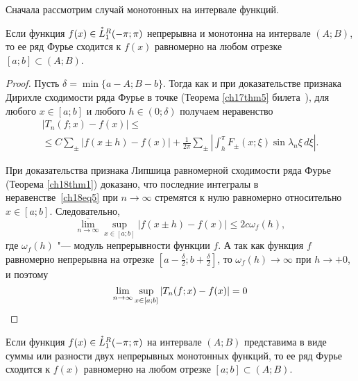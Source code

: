 Сначала рассмотрим случай монотонных на интервале функций.

\begin{thm} \label{ch18thm3}
Если функция $f(x) \in \accentset{*}{L}^{R}_1(-\pi;\pi)$ непрерывна и монотонна на интервале $(A;B)$, то ее ряд Фурье сходится к $f(x)$ равномерно на любом отрезке $[a;b] \subset (A;B)$.
\end{thm}
\begin{proof}
Пусть $\delta = \min \{a - A; B - b\}$. Тогда как и при доказательстве признака Дирихле сходимости ряда Фурье в точке (Теорема \ref{ch17thm5} билета~), для любого $x \in [a;b]$ и любого $h \in (0;\delta)$ получаем неравенство
\begin{multline} \label{ch18eq5}
|T_n(f; x) - f(x)| \le\\
\le C\sum_{\pm}|f(x \pm h) - f(x)| + \frac{1}{2\pi} \sum_{\pm} \left|\int_{h}^{\pi} F_{\pm}(x; \xi) \sin{\lambda_n \xi} \,d\xi \right|.
\end{multline}

При доказательства признака Липшица равномерной сходимости ряда Фурье (Теорема \ref{ch18thm1}) доказано, что последние интегралы в неравенстве~\eqref{ch18eq5} при $n \to \infty$ стремятся к нулю равномерно относительно $x \in [a;b]$. Следовательно,
$$
\overline{\lim\limits_{n \to \infty}} \sup\limits_{x \in [a;b]} |f(x \pm h) - f(x)| \le 2c\omega_{f}(h),
$$
где $\omega_{f}(h)$ "--- модуль непрерывности функции $f$. А так как функция $f$ равномерно непрерывна на отрезке $\left[a - \frac{\delta}{2}; b + \frac{\delta}{2}\right]$, то $\omega_{f}(h) \to \infty$ при $h \to +0$, и поэтому
\begin{equation*}
\lim\limits_{n \to \infty} \sup\limits_{x \in [a;b]} |T_n(f; x) - f(x)| = 0 \qedhere
\end{equation*}
\end{proof}
\begin{cons}
Если функция $f(x) \in \accentset{*}{L}^{R}_1(-\pi;\pi)$ на интервале $(A;B)$ представима в виде суммы или разности двух непрерывных монотонных функций, то ее ряд Фурье сходится к $f(x)$ равномерно на любом отрезке $[a;b] \subset (A;B)$.
\end{cons}

